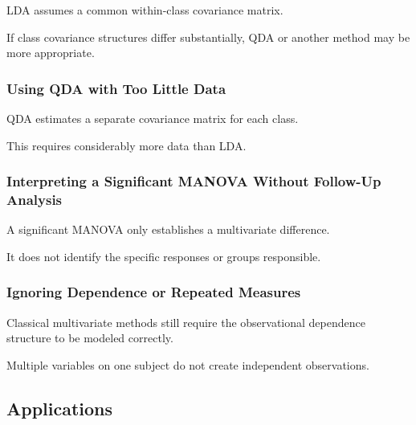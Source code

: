 LDA assumes a common within-class covariance matrix.

If class covariance structures differ substantially, QDA or another
method may be more appropriate.

\subsubsection{Using QDA with Too Little Data}

QDA estimates a separate covariance matrix for each class.

This requires considerably more data than LDA.

\subsubsection{Interpreting a Significant MANOVA Without Follow-Up Analysis}

A significant MANOVA only establishes a multivariate difference.

It does not identify the specific responses or groups responsible.

\subsubsection{Ignoring Dependence or Repeated Measures}

Classical multivariate methods still require the observational dependence
structure to be modeled correctly.

Multiple variables on one subject do not create independent observations.

\subsection{Applications}
\label{subsec:multivariate-applications}

